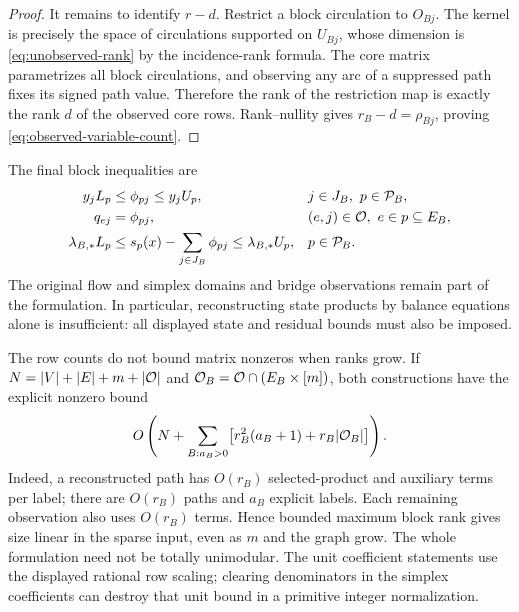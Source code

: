 \begin{proof}
It remains to identify $r-d$. Restrict a block circulation to $O_{Bj}$.
The kernel is precisely the space of circulations supported on $U_{Bj}$,
whose dimension is \eqref{eq:unobserved-rank} by the incidence-rank formula.
The core matrix parametrizes all block circulations, and observing any
arc of a suppressed path fixes its signed path value. Therefore the rank
of the restriction map is exactly the rank $d$ of the observed core rows.
Rank--nullity gives $r_B-d=\rho_{Bj}$, proving
\eqref{eq:observed-variable-count}.
\end{proof}

The final block inequalities are
\begin{align}
 y_jL_p&\le\phi_{pj}\le y_jU_p,
       &&j\in J_B,\ p\in\mathcal P_B,\label{eq:observed-state-bounds}\\
 q_{ej}&=\phi_{pj},
       &&(e,j)\in\mathcal O,\ e\in p\subseteq E_B,\label{eq:observed-equalities}\\
 \lambda_{B,*}L_p&\le s_p(x)-\sum_{j\in J_B}\phi_{pj}
                       \le\lambda_{B,*}U_p,
       &&p\in\mathcal P_B.\label{eq:observed-residual-bounds}
\end{align}
The original flow and simplex domains and bridge observations remain part
of the formulation. In particular, reconstructing state products by balance
equations alone is insufficient: all displayed state and residual bounds
must also be imposed.

The row counts do not bound matrix nonzeros when ranks grow. If
$N=|V|+|E|+m+|\mathcal O|$ and $\mathcal O_B=\mathcal O\cap(E_B\times[m])$, both
constructions have the explicit nonzero bound
\begin{equation}\label{eq:compression-nonzeros}
 O\left(N+\sum_{B:a_B>0}
       \bigl[r_B^2(a_B+1)+r_B|\mathcal O_B|\bigr]\right).
\end{equation}
Indeed, a reconstructed path has $O(r_B)$ selected-product and auxiliary
terms per label; there are $O(r_B)$ paths and $a_B$ explicit labels.
Each remaining observation also uses $O(r_B)$ terms. Hence bounded maximum
block rank gives size linear in the sparse input, even as $m$ and the graph
grow. The whole formulation need not be totally unimodular.
The unit coefficient statements use the displayed rational row scaling;
clearing denominators in the simplex coefficients can destroy that unit
bound in a primitive integer normalization.

